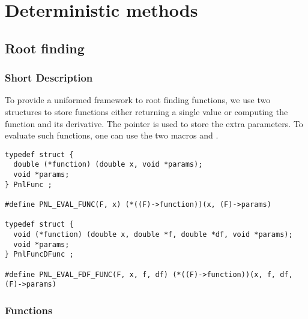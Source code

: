 \section{Deterministic methods}

\subsection{Root finding}
\subsubsection{Short Description}

To provide a uniformed framework to root finding functions, we use two
structures to store functions either returning a single value or computing the
function and its derivative. The pointer  is used to store the
extra parameters. To evaluate such functions, one can use the two macros
 and .
\begin{verbatim}
typedef struct {
  double (*function) (double x, void *params);
  void *params;
} PnlFunc ;

#define PNL_EVAL_FUNC(F, x) (*((F)->function))(x, (F)->params)

typedef struct {
  void (*function) (double x, double *f, double *df, void *params);
  void *params;
} PnlFuncDFunc ;

#define PNL_EVAL_FDF_FUNC(F, x, f, df) (*((F)->function))(x, f, df, (F)->params)
\end{verbatim}

\subsubsection{Functions}

